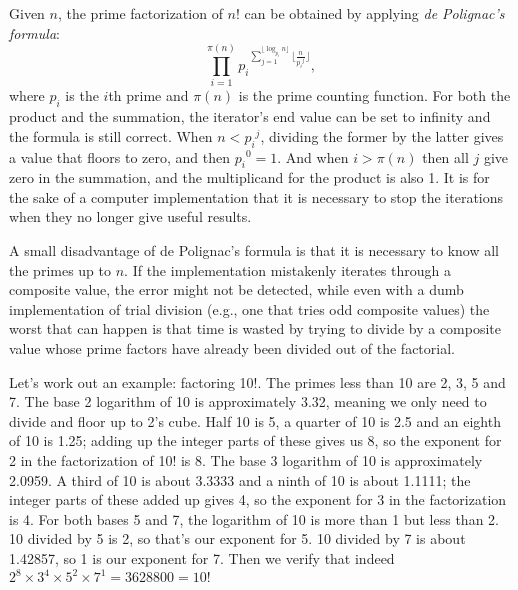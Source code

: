\documentclass[12pt]{article}
\begin{document}
Given $n$, the prime factorization of $n!$ can be obtained by applying {\em de Polignac's formula}: $$\prod_{i = 1}^{\pi(n)} {p_i}^{\displaystyle \sum_{j = 1}^{\lfloor \log_{p_i} n \rfloor} \lfloor \frac{n}{{p_i}^j} \rfloor},$$ where $p_i$ is the $i$th prime and $\pi(n)$ is the prime counting function. For both the product and the summation, the iterator's end value can be set to infinity and the formula is still correct. When $n < {p_i}^j$, dividing the former by the latter gives a value that floors to zero, and then ${p_i}^0 = 1$. And when $i > \pi(n)$ then all $j$ give zero in the summation, and the multiplicand for the product is also 1. It is for the sake of a computer implementation that it is necessary to stop the iterations when they no longer give useful results.

A small disadvantage of de Polignac's formula is that it is necessary to know all the primes up to $n$. If the implementation mistakenly iterates through a composite value, the error might not be detected, while even with a dumb implementation of trial division (e.g., one that tries odd composite values) the worst that can happen is that time is wasted by trying to divide by a composite value whose prime factors have already been divided out of the factorial.

Let's work out an example: factoring 10!. The primes less than 10 are 2, 3, 5 and 7. The base 2 logarithm of 10 is approximately 3.32, meaning we only need to divide and floor up to 2's cube. Half 10 is 5, a quarter of 10 is 2.5 and an eighth of 10 is 1.25; adding up the integer parts of these gives us 8, so the exponent for 2 in the factorization of 10! is 8. The base 3 logarithm of 10 is approximately 2.0959. A third of 10 is about 3.3333 and a ninth of 10 is about 1.1111; the integer parts of these added up gives 4, so the exponent for 3 in the factorization is 4. For both bases 5 and 7, the logarithm of 10 is more than 1 but less than 2. 10 divided by 5 is 2, so that's our exponent for 5. 10 divided by 7 is about 1.42857, so 1 is our exponent for 7. Then we verify that indeed $2^8 \times 3^4 \times 5^2 \times 7^1 = 3628800 = 10!$
\end{document}
